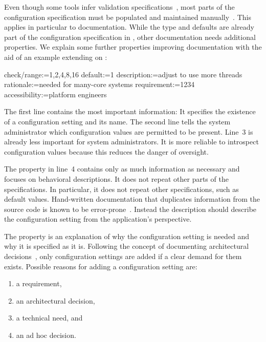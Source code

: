 Even though some tools infer validation specifications~\cite{nadi2014mining,kiciman2004discovering,xu2013blame}, most parts of the configuration specification must be populated and maintained manually~\cite{mens2005evolution,chow2008survey}.
This applies in particular to documentation.
While the type and defaults are already part of the configuration specification in \elektra{}, other documentation needs additional properties.
We explain some further properties improving documentation with the aid of an example extending on :

\begin{code}
  check/range:=1,2,4,8,16
  default:=1
  description:=adjust to use more threads
  rationale:=needed for many-core systems
  requirement:=1234
  accessibility:=platform engineers
\end{code}

The first line contains the most important information:
It specifies the existence of a configuration setting and its name.
The second line tells the system administrator which configuration values are permitted to be present.
Line~3 is already less important for system administrators.
It is more reliable to introspect configuration values because this reduces the danger of oversight.

The property  in line~4 contains only as much information as necessary and focuses on behavioral descriptions.
It does not repeat other parts of the specifications.
In particular, it does not repeat other specifications, such as default values.
Hand-written documentation that duplicates information from the source code is known to be error-prone~\cite{rubio2010expect}.
Instead the description should describe the configuration setting from the application's perspective.

The property  is an explanation of why the configuration setting is needed and why it is specified as it is.
Following the concept of documenting architectural decisions~\cite{zdun2007patterns}, only configuration settings are added if a clear demand for them exists.
Possible reasons for adding a configuration setting are:
\begin{enumerate}
\item a requirement,
\item an architectural decision,
\item a technical need, and
\item an ad hoc decision.
\end{enumerate}


